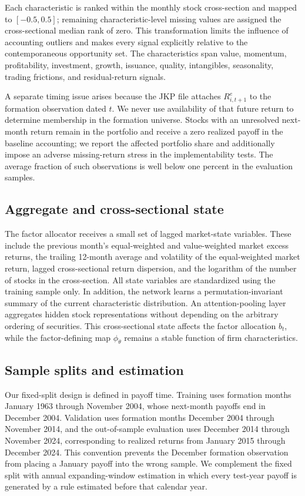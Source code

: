 \documentclass[12pt]{article}
\begin{document}
Each characteristic is ranked within the monthly stock cross-section and mapped to $[-0.5,0.5]$; remaining characteristic-level missing values are assigned the cross-sectional median rank of zero. This transformation limits the influence of accounting outliers and makes every signal explicitly relative to the contemporaneous opportunity set. The characteristics span value, momentum, profitability, investment, growth, issuance, quality, intangibles, seasonality, trading frictions, and residual-return signals.

A separate timing issue arises because the JKP file attaches $R^e_{i,t+1}$ to the formation observation dated $t$. We never use availability of that future return to determine membership in the formation universe. Stocks with an unresolved next-month return remain in the portfolio and receive a zero realized payoff in the baseline accounting; we report the affected portfolio share and additionally impose an adverse missing-return stress in the implementability tests. The average fraction of such observations is well below one percent in the evaluation samples.

\subsection{Aggregate and cross-sectional state}
The factor allocator receives a small set of lagged market-state variables. These include the previous month's equal-weighted and value-weighted market excess returns, the trailing 12-month average and volatility of the equal-weighted market return, lagged cross-sectional return dispersion, and the logarithm of the number of stocks in the cross-section. All state variables are standardized using the training sample only.
In addition, the network learns a permutation-invariant summary of the current characteristic distribution. An attention-pooling layer aggregates hidden stock representations without depending on the arbitrary ordering of securities. This cross-sectional state affects the factor allocation $b_t$, while the factor-defining map $\phi_\theta$ remains a stable function of firm characteristics.

\subsection{Sample splits and estimation}
Our fixed-split design is defined in payoff time. Training uses formation months January 1963 through November 2004, whose next-month payoffs end in December 2004. Validation uses formation months December 2004 through November 2014, and the out-of-sample evaluation uses December 2014 through November 2024, corresponding to realized returns from January 2015 through December 2024. This convention prevents the December formation observation from placing a January payoff into the wrong sample. We complement the fixed split with annual expanding-window estimation in which every test-year payoff is generated by a rule estimated before that calendar year.
\end{document}

